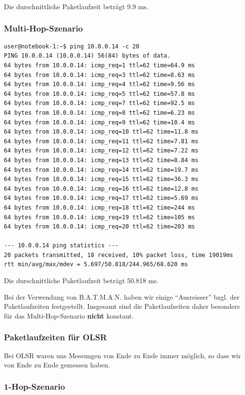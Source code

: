 \documentclass[a4paper,10pt]{article}
\begin{document}
Die durschnittliche Paketlaufzeit beträgt 9.9 ms.

\subsubsection*{Multi-Hop-Szenario}

\begin{lstlisting}
user@notebook-1:~$ ping 10.0.0.14 -c 20
PING 10.0.0.14 (10.0.0.14) 56(84) bytes of data.
64 bytes from 10.0.0.14: icmp_req=1 ttl=62 time=64.9 ms
64 bytes from 10.0.0.14: icmp_req=3 ttl=62 time=8.63 ms
64 bytes from 10.0.0.14: icmp_req=4 ttl=62 time=9.56 ms
64 bytes from 10.0.0.14: icmp_req=5 ttl=62 time=57.8 ms
64 bytes from 10.0.0.14: icmp_req=7 ttl=62 time=92.5 ms
64 bytes from 10.0.0.14: icmp_req=8 ttl=62 time=6.23 ms
64 bytes from 10.0.0.14: icmp_req=9 ttl=62 time=10.4 ms
64 bytes from 10.0.0.14: icmp_req=10 ttl=62 time=11.8 ms
64 bytes from 10.0.0.14: icmp_req=11 ttl=62 time=7.81 ms
64 bytes from 10.0.0.14: icmp_req=12 ttl=62 time=7.22 ms
64 bytes from 10.0.0.14: icmp_req=13 ttl=62 time=8.84 ms
64 bytes from 10.0.0.14: icmp_req=14 ttl=62 time=19.7 ms
64 bytes from 10.0.0.14: icmp_req=15 ttl=62 time=36.3 ms
64 bytes from 10.0.0.14: icmp_req=16 ttl=62 time=12.8 ms
64 bytes from 10.0.0.14: icmp_req=17 ttl=62 time=5.69 ms
64 bytes from 10.0.0.14: icmp_req=18 ttl=62 time=244 ms
64 bytes from 10.0.0.14: icmp_req=19 ttl=62 time=105 ms
64 bytes from 10.0.0.14: icmp_req=20 ttl=62 time=203 ms

--- 10.0.0.14 ping statistics --- 
20 packets transmitted, 18 received, 10% packet loss, time 19019ms
rtt min/avg/max/mdev = 5.697/50.818/244.965/68.620 ms
\end{lstlisting}

Die durschnittliche Paketlaufzeit beträgt 50.818 ms.

Bei der Verwendung von B.A.T.M.A.N. haben wir einige "`Ausreisser"' bzgl. der Paketlaufzeiten festgestellt.
Insgesamt sind die Paketlaufzeiten daher besonders für das Multi-Hop-Szenario \textbf{nicht} konstant.

\subsubsection{Paketlaufzeiten für OLSR}

Bei OLSR waren uns Messungen von Ende zu Ende immer möglich, so dass wir von Ende zu Ende gemessen haben.

\subsubsection*{1-Hop-Szenario}
\end{document}
